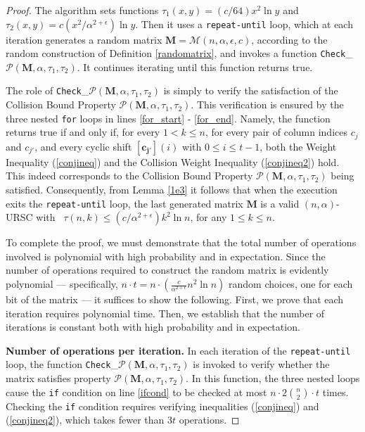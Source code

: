 \documentclass[11pt]{article}
\begin{document}
\begin{proof}
The algorithm sets functions $\tau_1(x,y) = (c/64 )x^2 \ln y$
and $\tau_2(x,y) = c (x^2/\alpha^{2+\epsilon})\ln y$.
Then it uses a \texttt{repeat-until} loop, which at each iteration generates a random matrix 
$\mathbf{M} = {\mathcal{M}}(n,\alpha, \epsilon, c)$, according to the random construction of  
Definition \ref{randomatrix}, and invokes a function 
\texttt{Check}\_$\mathcal{P}(\mathbf{M}, \alpha, \tau_1, \tau_2)$.
It continues iterating until this function returns {\sc true}.

The role of \texttt{Check}\_$\mathcal{P}(\mathbf{M}, \alpha, \tau_1, \tau_2)$ is simply to verify 
the satisfaction of the Collision Bound Property $\mathcal{P}(\mathbf{M}, \alpha, \tau_1, \tau_2)$. 
This verification is ensured by the three nested \texttt{for} loops in lines \ref{for_start} - \ref{for_end}. 
Namely, the function returns {\sc true} if and only if, 
for every $1 < k \leq n$, for every pair of column 
indices $c_j$ and $c_{j'}$, and every cyclic shift $\mathbf{[c_{j'}]}(i)$ with $0 \leq i \leq t-1$, 
both the Weight Inequality (\ref{conjineq}) and the Collision Weight Inequality (\ref{conjineq2})
hold.
This indeed corresponds to the Collision Bound Property 
$\mathcal{P}(\mathbf{M}, \alpha, \tau_1, \tau_2)$ being satisfied. 
Consequently, from Lemma \ref{1e3} it follows that when the execution exits the \texttt{repeat-until} loop,
the last generated matrix $\mathbf{M}$ is a valid 
$(n,\alpha)$-URSC with \elongation\ 
$\tau(n,k) \le (c/\alpha^{2+\epsilon}) k^2 \ln n$, 
for any $1\le k \le n$.

To complete the proof, we must demonstrate that the total number of operations involved is polynomial 
with high probability and in expectation. Since the number of operations required to construct the 
random matrix is evidently polynomial — specifically, 
$n \cdot t = n \cdot \left(\frac{c}{\alpha^{2+\epsilon}} n^2 \ln n \right)$ random choices, 
one for each bit of the matrix — it suffices to show the following. 
First, we prove that each iteration requires polynomial time. Then, we establish that the number 
of iterations is constant both with high probability and in expectation.

\medskip
\textbf{Number of operations per iteration.}
In each iteration of the 
\texttt{repeat-until} loop, 
the function 
\texttt{Check}\_$\mathcal{P}(\mathbf{M}, \alpha, \tau_1, \tau_2)$ is invoked to verify whether the matrix satisfies 
property $\mathcal{P}(\mathbf{M}, \alpha, \tau_1, \tau_2)$. 
In this function, the three nested loops cause the \texttt{if} condition on 
line \ref{ifcond} to be checked at most 
$n\cdot 2\binom{n}{2} \cdot t$ 
times. 
Checking the \texttt{if} condition requires verifying inequalities (\ref{conjineq}) and (\ref{conjineq2}), 
which takes fewer than $3t$ operations. 


\end{proof}
\end{document}
